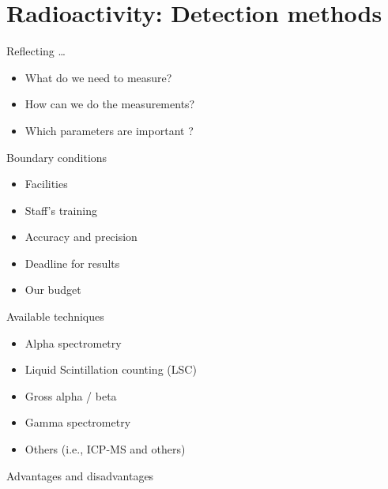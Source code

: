 \section{Radioactivity: Detection methods}

\frame{\tableofcontents[currentsection]}

\begin{frame}{Reflecting \ldots}

\begin{exampleblock}{}

\begin{itemize}
	\item What do we need to measure? 
	\item How can we do the measurements?
	\item Which parameters are important ? 
\end{itemize}

\end{exampleblock}

\vskip0.5cm
\pause
\centering \alert{Boundary conditions}

\begin{alertblock}{}

\begin{itemize}
	\item Facilities
 	\item Staff’s training
 	\item Accuracy and precision
 	\item Deadline for results
 	\item Our budget 
\end{itemize}

\end{alertblock}

\end{frame}


\begin{frame}{Available techniques}

\begin{itemize}
	\item Alpha spectrometry
 	\item Liquid Scintillation counting (LSC)
 	\item Gross alpha / beta
 	\item Gamma spectrometry
 	\item Others (i.e., ICP-MS and others)
\end{itemize}

\centering \arrowdown

\vskip0.5cm \centering \alert{{\large Advantages and disadvantages}}

\end{frame}

